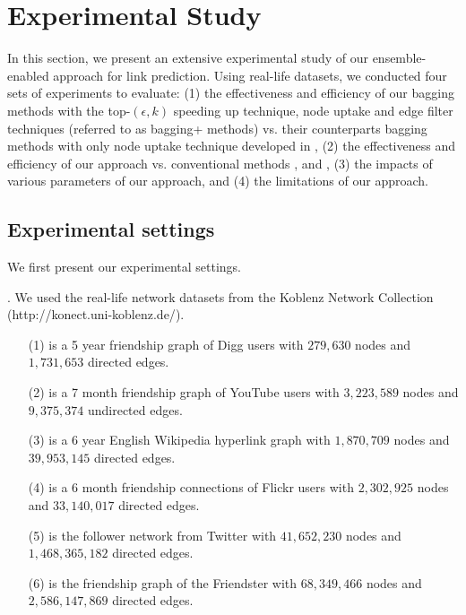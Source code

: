 \section{Experimental Study}
\label{sec-exp}

In this section, we present an extensive experimental study of our ensemble-enabled approach for link prediction.
Using real-life datasets, we conducted four sets of experiments to evaluate:
(1) the effectiveness and efficiency of our bagging methods with the top-$(\epsilon, k)$ speeding up technique,
node uptake and edge filter techniques (referred to as bagging+ methods)
vs. their counterparts bagging methods with only node uptake technique developed in \cite{liang2016},
(2) the effectiveness and efficiency of our approach vs. conventional methods \Aa \cite{adamic},
\RA \cite{zhou2009} and \BIGCLAM \cite{yang-wsdm2013},
(3) the impacts of various parameters of our approach,
and (4) the limitations of our approach.


\subsection{Experimental settings}

We first present our experimental settings.

. We used the real-life network datasets
from the Koblenz Network Collection ({\small http://konect.uni-koblenz.de/}).


\begin{enumerate}

\item[(1)] \Digg is a 5 year friendship graph of Digg users with
$279,630$ nodes and $1,731,653$ directed edges.

\item[(2)] \YouTube is a 7 month  friendship graph of YouTube users
with $3,223,589$ nodes and $9,375,374$ undirected edges.

\item[(3)]  \Wikipedia is a 6 year English Wikipedia hyperlink graph
with $1,870,709$ nodes and $39,953,145$ directed edges.

\item[(4)]  \Flickr is a 6 month friendship connections of Flickr users
with $2,302,925$ nodes and $33,140,017$ directed edges.

\item[(5)]  \Twitter is the follower network from Twitter with $41,652,230$ nodes
  and $1,468,365,182$ directed edges.

\item[(6)]  \Friendster is the friendship graph of the Friendster with $68,349,466$
  nodes and $2,586,147,869$ directed edges.

\end{enumerate}


